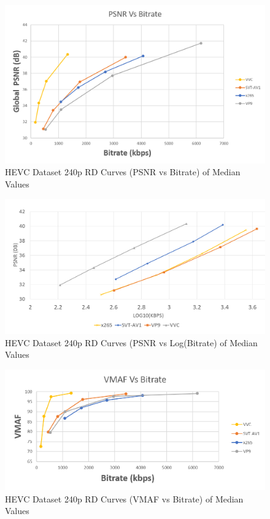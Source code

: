 \documentclass{book}
\begin{document}
\begin{figure}[hbt!]
	\centering
	\includegraphics[width=1.0\linewidth]{pictures/ch7/HEVC-240p_BD-PSNR.png}
	\caption{HEVC Dataset 240p RD Curves (PSNR vs Bitrate) of Median Values}
\label{fig:HEVC-240p-PSNR}
\end{figure}
\clearpage
\begin{figure}[hbt!]
	\centering
	\includegraphics[width=\linewidth]{pictures/ch7/HEVC-240p_BD-logPSNR.png}
	\caption{HEVC Dataset 240p RD Curves (PSNR vs Log(Bitrate) of Median Values}
	\label{fig:HEVC-240p-logPSNR}
\end{figure}

\begin{figure}[hbt!]
	\centering
	\includegraphics[width=1.0\linewidth]{pictures/ch7/HEVC-240p_BD-VMAF.png}
	\caption{HEVC Dataset 240p RD Curves (VMAF vs Bitrate) of Median Values}
\label{fig:HEVC-240p-VMAF}
\end{figure}
\end{document}

